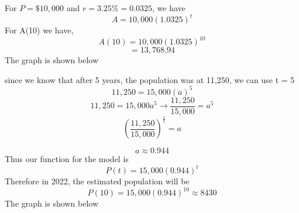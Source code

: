 \documentclass{report}
\begin{document}
\noindent For $P = \$10,000$ and $r = 3.25\% = 0.0325$, we have
$$A = 10,000(1.0325)^t$$
\bigbreak \noindent
For A(10) we have,
$$ A(10) = 10,000(1.0325)^10$$
$$ = 13,768.94$$
\bigbreak \noindent
The graph is shown below
\bigbreak 
\begin{figure}[ht]
    \centering
\end{figure}
\pagebreak
{}
\bigbreak \noindent
\sol
\bigbreak \noindent
since we know that after 5 years, the population was at 11,250, we can use t = 5
$$11,250 = 15,000(a)^5$$
$$11,250 = 15,000a^5 \rightarrow \frac{11,250}{15,000} = a^5$$
$$\left(\frac{11,250}{15,000}\right)^{\frac{1}{5}} = a$$

$$a \approx 0.944$$
\bigbreak \noindent
Thus our function for the model is $$P(t) = 15,000(0.944)^t$$
\bigbreak \noindent 
Therefore in 2022, the estimated population will be
$$P(10) = 15,000(0.944)^{10} \approx 8430$$
\bigbreak \noindent
The graph is shown below
\bigbreak \noindent
\begin{figure}[ht]
    \centering
\end{figure}
\pagebreak
\end{document}
